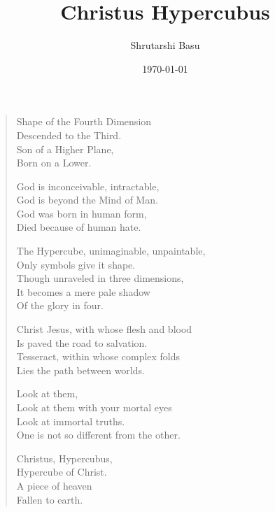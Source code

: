 \documentclass[11pt,letterpaper]{article}
\title{Christus Hypercubus}
\author{Shrutarshi Basu}
\date{\today}
\begin{document}
\maketitle
\begin{verse}
Shape of the Fourth Dimension\\
Descended to the Third.\\
Son of a Higher Plane,\\
Born on a Lower.

God is inconceivable, intractable,\\
God is beyond the Mind of Man.\\
God was born in human form,\\
Died because of human hate.

The Hypercube, unimaginable, unpaintable,\\
Only symbols give it shape.\\
Though unraveled in three dimensions,\\
It becomes a mere pale shadow \\
Of the glory in four.

Christ Jesus, with whose flesh and blood\\
Is paved the road to salvation.\\
Tesseract, within whose complex folds\\
Lies the path between worlds.

Look at them,\\
Look at them with your mortal eyes\\
Look at immortal truths.\\
One is not so different from the other.

Christus, Hypercubus,\\
Hypercube of Christ.\\
A piece of heaven\\
Fallen to earth.
\end{verse}

\end{document}
